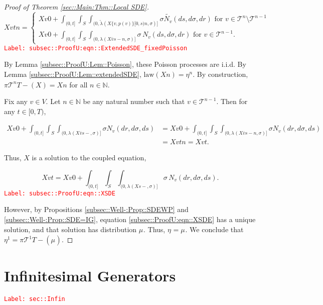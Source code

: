\documentclass[12pt]{article}
\newcommand{\mb}{\mathbb}
\newcommand{\mc}{\mathcal}
\newcommand{\ov}{\overline}
\newcommand{\te}{\text}
\newcommand{\tr}{\textcolor{red}}
\newcommand{\labe}[1]{\tr{\texttt{Label: #1}}}
\newcommand{\ind}{\hspace{24pt}}
\renewcommand{\v}{v}							%
\renewcommand{\S}{S}							%
\newcommand{\s}{\sigma}							%
\newcommand{\T}{T}								%
\renewcommand{\t}{t}							%
\newcommand{\proj}{\pi}							%
\renewcommand{\tt}{s}							%
\newcommand{\X}{X}								%
\newcommand{\cl}{\ov}							%
\newcommand{\poiss}[1]{N_{#1}}						%
\newcommand{\pup}[1]{^{#1}}							%
\newcommand{\tree}{\mc{T}}							%
\renewcommand{\r}{r}								%
\newcommand{\numb}{n}								%
\newcommand{\m}[3]{\mu_{#2#1}^{#3}}						%
\newcommand{\mmm}[3]{\eta_{#2#1}^{#3}}						%
\newcommand{\rate}[1]{\lambda_{#1}}					%
\newcommand{\crate}[2]{\alt{\lambda}_{#1}^{#2}}		%
\newcommand{\alt}{\widetilde}						%
\newcommand{\p}[1]{p(#1)}						%
\begin{document}
\begin{proof}[Proof of Theorem \ref{sec::Main:Thm::Local SDE}]
\begin{equation}
\X{\v}{\t}{\numb} = \begin{cases}
\X{\v}{0}{} + \int_{(0,\t]}\int_\S\int_{(0,\crate{}{}(\X{\{\v,\p{\v}\}}{[0,\tt)}{\numb},\s)]}\s\alt{\poiss{\v}}(d\tt,d\s,d\r)\te{ for } \v \in \tree\pup{\numb}\setminus\tree\pup{\numb-1}\\
\X{\v}{0}{} + \int_{(0,\t]}\int_\S\int_{(0,\rate{}(\X{\cl{\v}}{\tt-}{\numb},\s)]}\s\,\poiss{\v}(d\tt,d\s,d\r)\te{ for } \v \in \tree\pup{\numb-1}.
\end{cases}
\label{subsec::ProofU:eqn::ExtendedSDE_fixedPoisson}
\end{equation}
\labe{subsec::ProofU:eqn::ExtendedSDE\_fixedPoisson}

By Lemma \ref{subsec::ProofU:Lem::Poisson}, these Poisson processes are i.i.d. By Lemma \ref{subsec::ProofU:Lem::extendedSDE}, \(\te{law}(\X{}{}{\numb}) = \mmm{}{}{\numb}\). By construction, \(\proj{\tree\pup{\numb}}{\T-}(\X{}{}) = \X{}{}{\numb}\) for all \(\numb\in\mb{N}\).

\ind Fix any \(\v\in V\). Let \(\numb\in \mb{N}\) be any natural number such that \(\v\in \tree\pup{\numb-1}\). Then for any \(\t \in [0,\T)\),

\begin{align*}
\X{\v}{0} + \int_{(0,\t]}\int_\S\int_{(0,\rate{}(\X{\cl{\v}}{\tt-},\s)]}\s\poiss{\v}(d\r,d\s,d\tt) &= \X{\v}{0} + \int_{(0,\t]}\int_\S\int_{(0,\rate{}(\X{\cl{\v}}{\tt-}{\numb},\s)]}\s\poiss{\v}(d\r,d\s,d\tt)\\
&=\X{\v}{\t}{\numb} = \X{\v}{\t}.
\end{align*}

Thus, \(\X{}{}\) is a solution to the coupled equation,

\begin{equation}
\X{\v}{\t} = \X{\v}{0} + \int_{(0,\t]}\int_\S \int_{(0,\rate{}(\X{}{\tt-},\s)]}\s\,\poiss{\v}(d\r,d\s,d\tt).
\label{subsec::ProofU:eqn::XSDE}
\end{equation}
\labe{subsec::ProofU:eqn::XSDE}

However, by Propositions \ref{subsec::Well-:Prop::SDEWP} and \ref{subsec::Well-:Prop::SDE=IG}, equation \eqref{subsec::ProofU:eqn::XSDE} has a unique solution, and that solution has distribution \(\m{}{}{}\). Thus, \(\mmm{}{}{} = \m{}{}{}\). We conclude that \(\mmm{}{}{1} = \proj{\tree\pup{1}}{\T-}(\m{}{}{})\).

\end{proof}
\newpage
\appendix

\section{Infinitesimal Generators}
\label{sec::Infin}\labe{sec::Infin}
\end{document}
